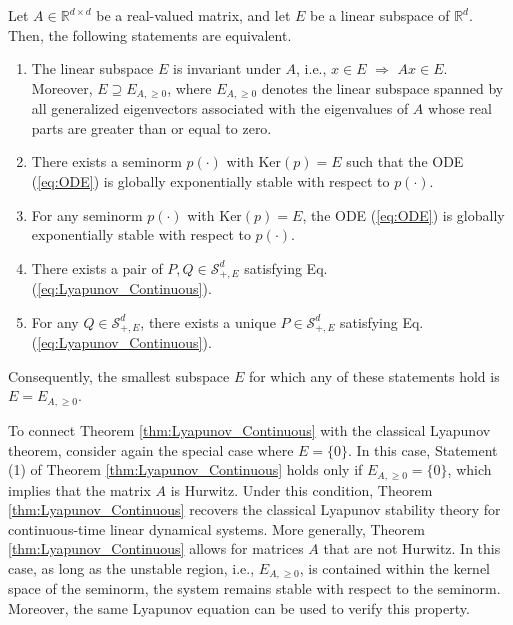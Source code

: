 \documentclass[11 pt]{article}
\begin{document}
	\begin{theorem}\label{thm:Lyapunov_Continuous}
		Let $A \in \mathbb{R}^{d \times d}$ be a real-valued matrix, and let $E$ be a linear subspace of $\mathbb{R}^d$. Then, the following statements are equivalent.
		\begin{enumerate}[(1)]
			\item  The linear subspace $E$ is invariant under $A$, i.e., $x\in E$ $\Rightarrow$ $Ax\in E$. Moreover, $E\supseteq E_{A,\geq 0}$, where $E_{A,\geq 0}$ denotes the linear subspace spanned by all generalized eigenvectors associated with the eigenvalues of $ A $ whose real parts are greater than or equal to zero.
			\item There exists a seminorm $p(\cdot)$ with $\text{Ker}(p) = E$ such that the ODE (\ref{eq:ODE}) is globally exponentially stable with respect to $p(\cdot)$.
			
			\item For any seminorm $p(\cdot)$ with $\text{Ker}(p) = E$, the ODE (\ref{eq:ODE}) is globally exponentially stable with respect to $p(\cdot)$.
			
			\item There exists a pair of $P, Q \in \mathcal{S}_{+,E}^d$ satisfying Eq. (\ref{eq:Lyapunov_Continuous}).
			
			\item For any $Q \in \mathcal{S}_{+,E}^d$, there exists a unique $P \in \mathcal{S}_{+,E}^d$ satisfying Eq. (\ref{eq:Lyapunov_Continuous}).
		\end{enumerate}
		Consequently, the smallest subspace $E$ for which any of these statements hold is $E = E_{A,\geq 0}$.
	\end{theorem}
	
	To connect Theorem \ref{thm:Lyapunov_Continuous} with the classical Lyapunov theorem, consider again the special case where $E=\{0\}$. In this case, Statement (1) of Theorem \ref{thm:Lyapunov_Continuous} holds only if $E_{A,\geq 0}=\{0\}$, which implies that the matrix $A$ is Hurwitz. Under this condition, Theorem \ref{thm:Lyapunov_Continuous} recovers the classical Lyapunov stability theory for continuous-time linear dynamical systems.  More generally, Theorem \ref{thm:Lyapunov_Continuous} allows for matrices $A$ that are not Hurwitz. In this case, as long as the unstable region, i.e., $E_{A,\geq 0}$, is contained within the kernel space of the seminorm, the system remains stable with respect to the seminorm. Moreover, the same Lyapunov equation can be used to verify this property.
	
\end{document}
